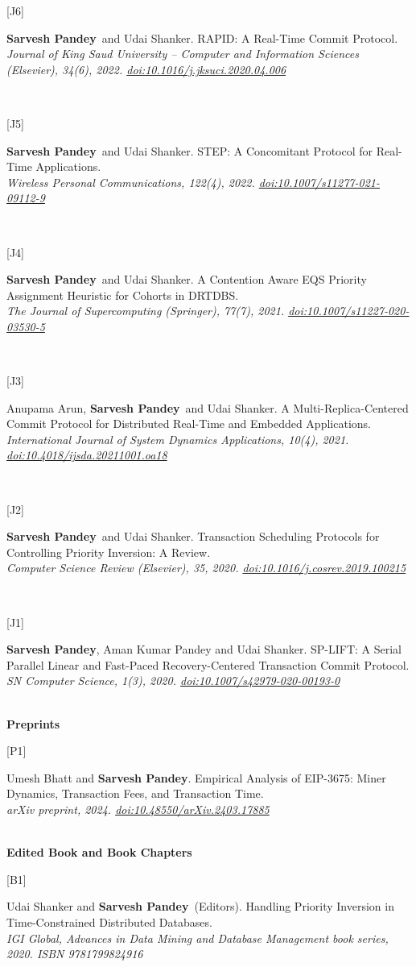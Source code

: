 \documentclass[11pt,a4paper]{article}
\newcommand{\me}{\textbf{Sarvesh Pandey}}
\newcommand{\pub}[3]{%
  \begin{minipage}[t]{0.045\textwidth}\raggedright\small #1\end{minipage}%
  \begin{minipage}[t]{0.945\textwidth}#2\\{\small\itshape #3}\end{minipage}\\[0.34em]%
}
\begin{document}
\pub{[J6]}{\me\ and Udai Shanker. RAPID: A Real-Time Commit Protocol.}{Journal of King Saud University -- Computer and Information Sciences (Elsevier), 34(6), 2022. \href{https://doi.org/10.1016/j.jksuci.2020.04.006}{doi:10.1016/j.jksuci.2020.04.006}}

\pub{[J5]}{\me\ and Udai Shanker. STEP: A Concomitant Protocol for Real-Time Applications.}{Wireless Personal Communications, 122(4), 2022. \href{https://doi.org/10.1007/s11277-021-09112-9}{doi:10.1007/s11277-021-09112-9}}

\pub{[J4]}{\me\ and Udai Shanker. A Contention Aware EQS Priority Assignment Heuristic for Cohorts in DRTDBS.}{The Journal of Supercomputing (Springer), 77(7), 2021. \href{https://doi.org/10.1007/s11227-020-03530-5}{doi:10.1007/s11227-020-03530-5}}

\pub{[J3]}{Anupama Arun, \me\ and Udai Shanker. A Multi-Replica-Centered Commit Protocol for Distributed Real-Time and Embedded Applications.}{International Journal of System Dynamics Applications, 10(4), 2021. \href{https://doi.org/10.4018/ijsda.20211001.oa18}{doi:10.4018/ijsda.20211001.oa18}}

\pub{[J2]}{\me\ and Udai Shanker. Transaction Scheduling Protocols for Controlling Priority Inversion: A Review.}{Computer Science Review (Elsevier), 35, 2020. \href{https://doi.org/10.1016/j.cosrev.2019.100215}{doi:10.1016/j.cosrev.2019.100215}}

\pub{[J1]}{\me, Aman Kumar Pandey and Udai Shanker. SP-LIFT: A Serial Parallel Linear and Fast-Paced Recovery-Centered Transaction Commit Protocol.}{SN Computer Science, 1(3), 2020. \href{https://doi.org/10.1007/s42979-020-00193-0}{doi:10.1007/s42979-020-00193-0}}

\vspace{0.4em}
\textbf{\small Preprints}\\[0.45em]

\pub{[P1]}{Umesh Bhatt and \me. Empirical Analysis of EIP-3675: Miner Dynamics, Transaction Fees, and Transaction Time.}{arXiv preprint, 2024. \href{https://doi.org/10.48550/arXiv.2403.17885}{doi:10.48550/arXiv.2403.17885}}

\vspace{0.4em}
\textbf{\small Edited Book and Book Chapters}\\[0.45em]

\pub{[B1]}{Udai Shanker and \me\ (Editors). Handling Priority Inversion in Time-Constrained Distributed Databases.}{IGI Global, Advances in Data Mining and Database Management book series, 2020. ISBN 9781799824916}
\end{document}
